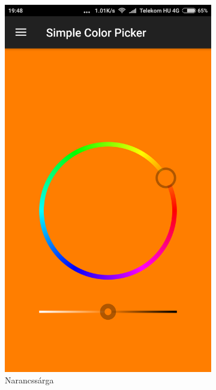 \documentclass[12pt]{extarticle}
\begin{document}
	\begin{figure}[h!]
		\centering
		\begin{subfigure}[b]{0.3\linewidth}
			\includegraphics[width=\linewidth]{sarga2.png}
			\caption{Narancssárga}
		\end{subfigure}
		\begin{subfigure}[b]{0.3\linewidth}

\end{subfigure}
\end{figure}
\end{document}

